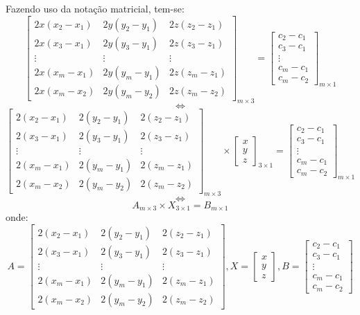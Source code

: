 	Fazendo uso da notação matricial, tem-se:
	\[
	\begin{bmatrix}
		2x(x_2-x_1) & 2y(y_2-y_1) & 2z(z_2-z_1)\\
		2x(x_3-x_1) & 2y(y_3-y_1) & 2z(z_3-z_1)\\
		\vdots & \vdots & \vdots\\
		2x(x_m-x_1) & 2y(y_m-y_1) & 2z(z_m-z_1)\\
		2x(x_m-x_2) & 2y(y_m-y_2) & 2z(z_m-z_2)
	\end{bmatrix}_{m\times3}
	=
	\begin{bmatrix}
		c_2-c_1\\
		c_3-c_1\\
		\vdots\\
		c_m-c_1\\
		c_m-c_2
	\end{bmatrix}_{m\times1}
	\]
	$$\iff$$
	\[
	\begin{bmatrix}
		2(x_2-x_1) & 2(y_2-y_1) & 2(z_2-z_1)\\
		2(x_3-x_1) & 2(y_3-y_1) & 2(z_3-z_1)\\
		\vdots & \vdots & \vdots\\
		2(x_m-x_1) & 2(y_m-y_1) & 2(z_m-z_1)\\
		2(x_m-x_2) & 2(y_m-y_2) & 2(z_m-z_2)
	\end{bmatrix}_{m\times3}
	\times
	\begin{bmatrix}
		x\\
		y\\
		z
	\end{bmatrix}_{3\times1}
	=
	\begin{bmatrix}
		c_2-c_1\\
		c_3-c_1\\
		\vdots\\
		c_m-c_1\\
		c_m-c_2
	\end{bmatrix}_{m\times1}
	\]
	$$\iff$$
	\begin{equation}A_{m\times3} \times X_{3\times1} = B_{m\times1}\label{eq:res}\end{equation}
	onde:
	\[
	A =
	\begin{bmatrix}
		2(x_2-x_1) & 2(y_2-y_1) & 2(z_2-z_1)\\
		2(x_3-x_1) & 2(y_3-y_1) & 2(z_3-z_1)\\
		\vdots & \vdots & \vdots\\
		2(x_m-x_1) & 2(y_m-y_1) & 2(z_m-z_1)\\
		2(x_m-x_2) & 2(y_m-y_2) & 2(z_m-z_2)
	\end{bmatrix},
	X =
	\begin{bmatrix}
		x\\
		y\\
		z
	\end{bmatrix},
	B =
	\begin{bmatrix}
		c_2-c_1\\
		c_3-c_1\\
		\vdots\\
		c_m-c_1\\
		c_m-c_2
	\end{bmatrix}
	\]

